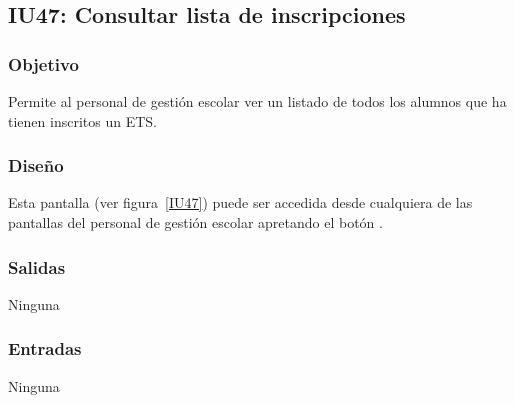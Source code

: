 
\subsection{IU47: Consultar lista de inscripciones}

\subsubsection{Objetivo}
Permite al personal de gestión escolar ver un listado de todos los alumnos que ha tienen inscritos un ETS.
\subsubsection{Diseño}
Esta pantalla  (ver figura~\ref{IU47}) puede ser accedida desde cualquiera de las pantallas del personal de gestión escolar apretando el botón .


\subsubsection{Salidas}
Ninguna
\subsubsection{Entradas}
Ninguna
